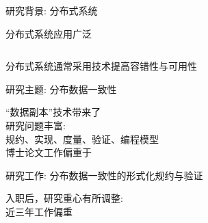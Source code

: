 
\begin{frame}{研究背景: 分布式系统}
  \begin{center}
    {\large 分布式系统应用广泛}
  \end{center}

  \begin{columns}
       \vspace{-0.60cm}
  \end{columns}

  \begin{center}
    {\large 分布式系统通常采用技术提高容错性与可用性}
  \end{center}
\end{frame}

\begin{frame}{研究主题: 分布数据一致性}
  \begin{center}
    {\large ``数据副本''技术带来了} \\[30pt]

    {\large 研究问题丰富:} \\[6pt]
    规约、实现、度量、验证、编程模型 \\[20pt]

    博士论文工作偏重于
  \end{center}
\end{frame}

\begin{frame}{研究工作: 分布数据一致性的形式化规约与验证}
  \begin{center}
    入职后，研究重心有所调整: \\[6pt]
    近三年工作偏重 \\[20pt]
  \end{center}
\end{frame}

